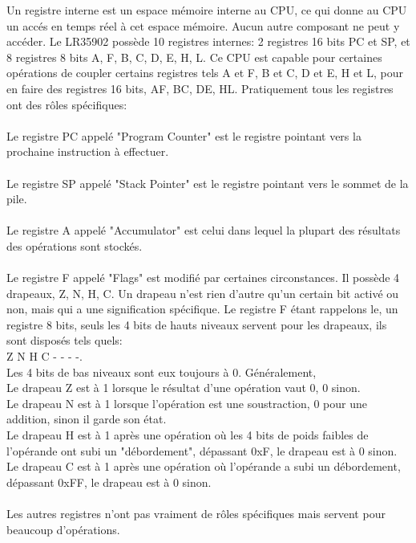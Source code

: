 \documentclass{report}
\begin{document}
Un registre interne est un espace mémoire interne au CPU, ce qui donne au CPU un accés en temps réel à cet espace mémoire. Aucun autre composant ne peut y accéder.
Le LR35902 possède 10 registres internes: 2 registres 16 bits PC et SP, et 8 registres 8 bits A, F, B, C, D, E, H, L.
Ce CPU est capable pour certaines opérations de coupler certains registres tels A et F, B et C, D et E, H et L, pour en faire des registres 16 bits, AF, BC, DE, HL.
Pratiquement tous les registres ont des rôles spécifiques:\\\\
Le registre PC appelé "Program Counter" est le registre pointant vers la prochaine instruction à effectuer.\\\\
Le registre SP appelé "Stack Pointer" est le registre pointant vers le sommet de la pile.\\\\
Le registre A appelé "Accumulator" est celui dans lequel la plupart des résultats des opérations sont stockés.\\\\
Le registre F appelé "Flags" est modifié par certaines circonstances.
Il possède 4 drapeaux, Z, N, H, C. Un drapeau n'est rien d'autre qu'un certain bit activé ou non, mais qui a une signification spécifique.
Le registre F étant rappelons le, un registre 8 bits, seuls les 4 bits de hauts niveaux servent pour les drapeaux, 
ils sont disposés tels quels: \\Z N H C - - - -.\\Les 4 bits de bas niveaux sont eux toujours à 0.
Généralement, \\Le drapeau Z est à 1 lorsque le résultat d'une opération vaut 0, 0 sinon.\\
Le drapeau N est à 1 lorsque l'opération est une soustraction, 0 pour une addition, sinon il garde son état.\\
Le drapeau H est à 1 après une opération où les 4 bits de poids faibles de l'opérande ont subi un "débordement", dépassant 0xF, le drapeau est à 0 sinon.\\
Le drapeau C est à 1 après une opération où l'opérande a subi un débordement, dépassant 0xFF, le drapeau est à 0 sinon.\\\\
Les autres registres n'ont pas vraiment de rôles spécifiques mais servent pour beaucoup d'opérations.
\end{document}
